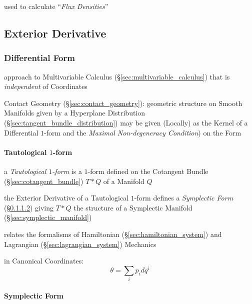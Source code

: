 used to calculate ``\emph{Flux Densities}'' %



\subsection{Exterior Derivative}\label{sec:exterior_derivative}

\subsubsection{Differential Form}\label{sec:differential_form}

approach to Multivariable Calculus (\S\ref{sec:multivariable_calculus})
that is \emph{independent} of Coordinates

\fist Contact Geometry (\S\ref{sec:contact_geometry}): geometric structure on
Smooth Manifolds given by a Hyperplane Distribution
(\S\ref{sec:tangent_bundle_distribution}) may be given (Locally) as the Kernel
of a Differential $1$-form and the \emph{Maximal Non-degeneracy Condition}) on
the Form



\paragraph{Tautological $1$-form}\label{sec:tautological_1form}\hfill

a \emph{Tautological $1$-form} is a $1$-form defined on the Cotangent Bundle
(\S\ref{sec:cotangent_bundle}) $T * Q$ of a Manifold $Q$

the Exterior Derivative of a Tautological $1$-form defines a \emph{Symplectic
  Form} (\S\ref{sec:symplectic_form}) giving $T * Q$ the structure of a
Symplectic Manifold (\S\ref{sec:symplectic_manifold})

relates the formalisms of Hamiltonian (\S\ref{sec:hamiltonian_system}) and
Lagrangian (\S\ref{sec:lagrangian_system}) Mechanics

in Canonical Coordinates:
\[
  \theta = \sum_i p_i dq^i
\]



\paragraph{Symplectic Form}\label{sec:symplectic_form}\hfill

